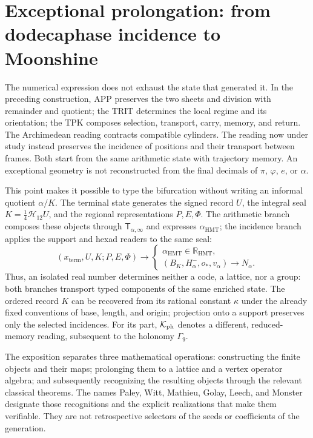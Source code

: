 \section{Exceptional prolongation: from dodecaphase incidence to Moonshine}
\label{exc:seccion}

The numerical expression does not exhaust the state that generated it. In the
preceding construction, APP preserves the two sheets and division with
remainder and quotient; the TRIT determines the local regime and its orientation;
the TPK composes selection, transport, carry, memory, and return. The
Archimedean reading contracts compatible cylinders. The reading now
under study instead preserves the incidence of positions and their
transport between frames. Both start from the same arithmetic state with
trajectory memory. An exceptional geometry is not
reconstructed from the final decimals
of $\pi$, $\varphi$, $e$, or $\alpha$.

This point makes it possible to type the bifurcation without writing an
informal quotient \(\alpha/K\). The terminal state generates the signed
record \(U\), the integral seal \(K=\frac14\mathcal H_{12}U\), and the
regional representations \(P,E,\Phi\). The arithmetic branch composes these
objects through \(\mathsf T_{\alpha,\infty}\) and expresses
\(\alpha_{\mathrm{HMT}}\); the incidence branch applies the support and
hexad readers to the same seal:
\[
 (x_{\mathrm{term}},U,K;P,E,\Phi)
 \longrightarrow
 \begin{cases}
  \alpha_{\mathrm{HMT}}\in\mathbb R_{\mathrm{HMT}},\\
  (B_K,H^-_\alpha,o_*,v_\alpha)\longrightarrow N_\alpha.
 \end{cases}
\]
Thus, an isolated real number determines neither a code, a lattice, nor a
group: both branches transport typed components of the same enriched state.
The ordered record \(K\) can be recovered from its rational constant
\(\kappa\) under the already fixed conventions of base, length, and origin;
projection onto a support preserves only the selected incidences. For its
part, $\mathcal K_{\rm ph}$
denotes a different, reduced-memory reading, subsequent to the holonomy
$\Gamma_9$.

The exposition separates three mathematical operations: constructing the
finite objects and their maps; prolonging them to a lattice and a vertex
operator algebra; and subsequently recognizing the resulting objects through
the relevant classical theorems. The names Paley, Witt, Mathieu, Golay, Leech, and
Monster designate those recognitions and the explicit realizations
that make them verifiable. They are not retrospective selectors of the
seeds or coefficients of the generation.

